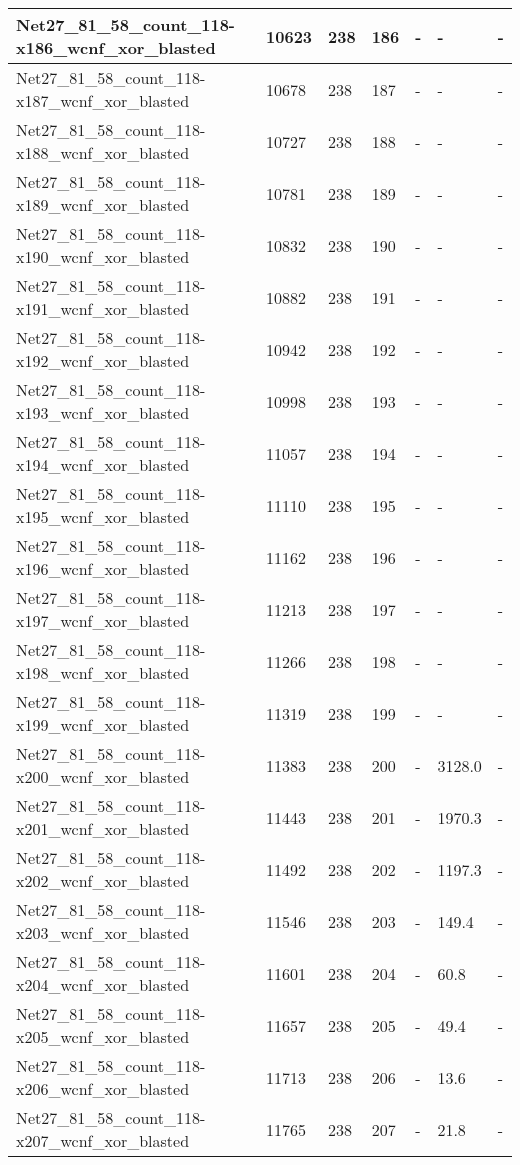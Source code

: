 \begin{scriptsize}
\begin{longtable}{|p{5cm}|l|l|l|l|l|l|}
Net27\_81\_58\_count\_118-x186\_wcnf\_xor\_blasted&10623&238&186&-&-&- \\ \hline 
Net27\_81\_58\_count\_118-x187\_wcnf\_xor\_blasted&10678&238&187&-&-&- \\ \hline 
Net27\_81\_58\_count\_118-x188\_wcnf\_xor\_blasted&10727&238&188&-&-&- \\ \hline 
Net27\_81\_58\_count\_118-x189\_wcnf\_xor\_blasted&10781&238&189&-&-&- \\ \hline 
Net27\_81\_58\_count\_118-x190\_wcnf\_xor\_blasted&10832&238&190&-&-&- \\ \hline 
Net27\_81\_58\_count\_118-x191\_wcnf\_xor\_blasted&10882&238&191&-&-&- \\ \hline 
Net27\_81\_58\_count\_118-x192\_wcnf\_xor\_blasted&10942&238&192&-&-&- \\ \hline 
Net27\_81\_58\_count\_118-x193\_wcnf\_xor\_blasted&10998&238&193&-&-&- \\ \hline 
Net27\_81\_58\_count\_118-x194\_wcnf\_xor\_blasted&11057&238&194&-&-&- \\ \hline 
Net27\_81\_58\_count\_118-x195\_wcnf\_xor\_blasted&11110&238&195&-&-&- \\ \hline 
Net27\_81\_58\_count\_118-x196\_wcnf\_xor\_blasted&11162&238&196&-&-&- \\ \hline 
Net27\_81\_58\_count\_118-x197\_wcnf\_xor\_blasted&11213&238&197&-&-&- \\ \hline 
Net27\_81\_58\_count\_118-x198\_wcnf\_xor\_blasted&11266&238&198&-&-&- \\ \hline 
Net27\_81\_58\_count\_118-x199\_wcnf\_xor\_blasted&11319&238&199&-&-&- \\ \hline 
Net27\_81\_58\_count\_118-x200\_wcnf\_xor\_blasted&11383&238&200&-&3128.0&- \\ \hline 
Net27\_81\_58\_count\_118-x201\_wcnf\_xor\_blasted&11443&238&201&-&1970.3&- \\ \hline 
Net27\_81\_58\_count\_118-x202\_wcnf\_xor\_blasted&11492&238&202&-&1197.3&- \\ \hline 
Net27\_81\_58\_count\_118-x203\_wcnf\_xor\_blasted&11546&238&203&-&149.4&- \\ \hline 
Net27\_81\_58\_count\_118-x204\_wcnf\_xor\_blasted&11601&238&204&-&60.8&- \\ \hline 
Net27\_81\_58\_count\_118-x205\_wcnf\_xor\_blasted&11657&238&205&-&49.4&- \\ \hline 
Net27\_81\_58\_count\_118-x206\_wcnf\_xor\_blasted&11713&238&206&-&13.6&- \\ \hline 
Net27\_81\_58\_count\_118-x207\_wcnf\_xor\_blasted&11765&238&207&-&21.8&- \\ \hline 

\end{longtable}
\end{scriptsize}
